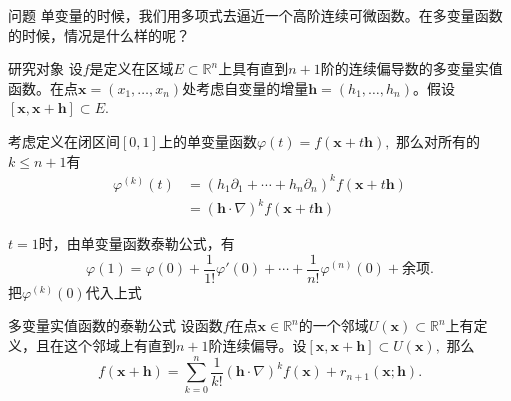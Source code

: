 \begin{frame}

\begin{block}{问题}
单变量的时候，我们用多项式去逼近一个高阶连续可微函数。在多变量函数的时候，情况是什么样的呢？
\end{block}

\vspace{2em}
\pause

\begin{block}{研究对象}
设$f$是定义在区域$E\subset \mathbb{R}^n$上具有直到$n+1$阶的连续偏导数的多变量实值函数。在点$\mathbf{x} = (x_1,\ldots,x_n)$处考虑自变量的增量$\mathbf{h} = (h_1,\ldots,h_n)$。假设$[\mathbf{x}, \mathbf{x} + \mathbf{h}] \subset E.$
\end{block}

\end{frame}


\begin{frame}

\begin{lem}
考虑定义在闭区间$[0,1]$上的单变量函数$\varphi(t) = f(\mathbf{x} + t\mathbf{h}),$ 那么对所有的$k\leqslant n+1$有
\begin{align*}
\varphi^{(k)}(t) & = \left( h_1\partial_1 + \cdots + h_n\partial_n \right)^k f(\mathbf{x} + t\mathbf{h}) \\
& = (\mathbf{h}\cdot\nabla)^k f(\mathbf{x} + t\mathbf{h})
\end{align*}
\end{lem}

\pause

$t=1$时，由单变量函数泰勒公式，有
$$\varphi(1) = \varphi(0) + \dfrac{1}{1!}\varphi'(0) + \cdots + \dfrac{1}{n!}\varphi^{(n)}(0) + \text{余项}.$$
把$\varphi^{(k)}(0)$代入上式

\end{frame}


\begin{frame}

\begin{block}{多变量实值函数的泰勒公式}
设函数$f$在点$\mathbf{x} \in \mathbb{R}^n$的一个邻域$U(\mathbf{x}) \subset \mathbb{R}^n$上有定义，且在这个邻域上有直到$n+1$阶连续偏导。设$[\mathbf{x}, \mathbf{x} + \mathbf{h}] \subset U(\mathbf{x}),$ 那么
$$f(\mathbf{x} + \mathbf{h}) = \sum\limits_{k=0}^n \dfrac{1}{k!} (\mathbf{h}\cdot\nabla)^k f(\mathbf{x}) + r_{n+1}(\mathbf{x}; \mathbf{h}).$$
\end{block}

\end{frame}

